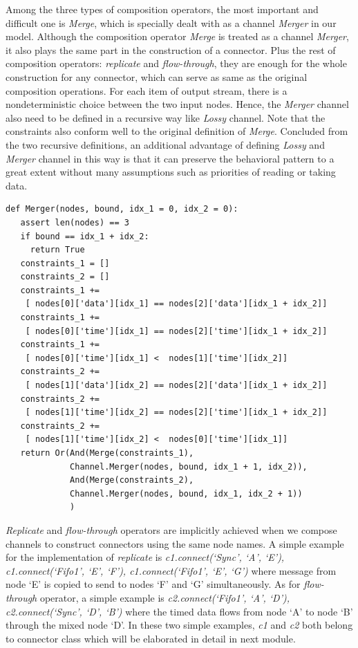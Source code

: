 \documentclass[3p,times]{elsarticle}
\begin{document}
Among the three types of composition operators, the most important and difficult one is \emph{Merge}, which is specially dealt with as a channel \emph{Merger} in our model. Although the composition operator \emph{Merge} is treated as a channel \emph{Merger}, it also plays the same part in the construction of a connector.  Plus the rest of composition operators: \emph{replicate} and \emph{flow-through}, they are enough for the whole construction for any connector, which can serve as same as the original composition operations. For each item of output stream, there is a nondeterministic choice between the two input nodes. Hence, the \emph{Merger} channel also need to be defined in a recursive way like \emph{Lossy} channel. Note that the constraints also conform well to the original definition of \emph{Merge}. Concluded from the two recursive definitions, an additional advantage of defining \emph{Lossy} and \emph{Merger} channel in this way is that it can preserve the behavioral pattern to a great extent without many assumptions such as priorities of reading or taking data.
\begin{lstlisting}[frame=single]
def Merger(nodes, bound, idx_1 = 0, idx_2 = 0):
   assert len(nodes) == 3
   if bound == idx_1 + idx_2:
     return True
   constraints_1 = []
   constraints_2 = []
   constraints_1 +=
    [ nodes[0]['data'][idx_1] == nodes[2]['data'][idx_1 + idx_2]]
   constraints_1 +=
    [ nodes[0]['time'][idx_1] == nodes[2]['time'][idx_1 + idx_2]]
   constraints_1 +=
    [ nodes[0]['time'][idx_1] <  nodes[1]['time'][idx_2]]
   constraints_2 +=
    [ nodes[1]['data'][idx_2] == nodes[2]['data'][idx_1 + idx_2]]
   constraints_2 +=
    [ nodes[1]['time'][idx_2] == nodes[2]['time'][idx_1 + idx_2]]
   constraints_2 +=
    [ nodes[1]['time'][idx_2] <  nodes[0]['time'][idx_1]]
   return Or(And(Merge(constraints_1),
             Channel.Merger(nodes, bound, idx_1 + 1, idx_2)),
             And(Merge(constraints_2),
             Channel.Merger(nodes, bound, idx_1, idx_2 + 1))
             )
\end{lstlisting}
\emph{Replicate} and \emph{flow-through} operators are implicitly achieved when we compose channels to construct connectors using the same node names. A simple example for the implementation of \emph{replicate} is \emph{c1.connect(`Sync', `A', `E'), c1.connect(`Fifo1', `E', `F'), c1.connect(`Fifo1', `E', `G')} where message from node `E' is copied to send to nodes `F' and `G' simultaneously. As for \emph{flow-through} operator, a simple example is \emph{c2.connect(`Fifo1', `A', `D'), c2.connect(`Sync', `D', `B')} where the timed data flows from node `A' to node `B' through the mixed node `D'. In these two simple examples, \emph{c1} and \emph{c2} both belong to connector class which will be elaborated in detail in next module.
\end{document}
